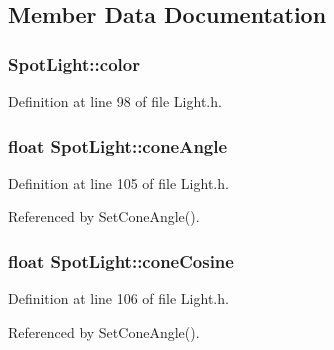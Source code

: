 \subsection{Member Data Documentation}
\subsubsection[{\texorpdfstring{color}{color}}]{ Spot\+Light\+::color}\hypertarget{struct_spot_light_ae1426c92b7130b3a608a5aa4a0a814cb}{}\label{struct_spot_light_ae1426c92b7130b3a608a5aa4a0a814cb}


Definition at line 98 of file Light.\+h.

\subsubsection[{\texorpdfstring{cone\+Angle}{coneAngle}}]{\setlength{\rightskip}{0pt plus 5cm}float Spot\+Light\+::cone\+Angle\hspace{0.3cm}{\ttfamily [private]}}\hypertarget{struct_spot_light_a03cf00fdd6b15023ea1ac5d2be65e591}{}\label{struct_spot_light_a03cf00fdd6b15023ea1ac5d2be65e591}


Definition at line 105 of file Light.\+h.



Referenced by Set\+Cone\+Angle().

\subsubsection[{\texorpdfstring{cone\+Cosine}{coneCosine}}]{\setlength{\rightskip}{0pt plus 5cm}float Spot\+Light\+::cone\+Cosine\hspace{0.3cm}{\ttfamily [private]}}\hypertarget{struct_spot_light_a6f02787ffab5a7b5e95b30b3353ad0ed}{}\label{struct_spot_light_a6f02787ffab5a7b5e95b30b3353ad0ed}


Definition at line 106 of file Light.\+h.



Referenced by Set\+Cone\+Angle().

